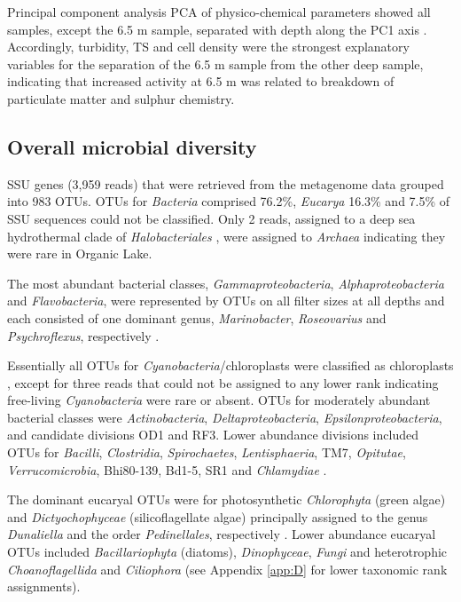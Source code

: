 Principal component analysis \acs{PCA} of physico-chemical parameters showed all samples, except the 6.5 m sample, separated with depth along the PC1 axis .
Accordingly, turbidity, \ac{TS} and cell density were the strongest explanatory variables for the separation of the 6.5 m sample from the other deep sample, indicating that increased activity at 6.5 m was related to breakdown of particulate matter and sulphur chemistry.
 

\subsection{Overall microbial diversity}
\ac{SSU} genes (3,959 reads) that were retrieved from the metagenome data grouped into 983 \acp{OTU}. 
\acp{OTU} for \emph{Bacteria} comprised 76.2\%, \emph{Eucarya} 16.3\% and 7.5\% of \ac{SSU} sequences could not be classified. 
Only 2 reads, assigned to a deep sea hydrothermal clade of \emph{Halobacteriales} , were assigned to \emph{Archaea} indicating they were rare in Organic Lake.
 
The most abundant bacterial classes, \emph{Gammaproteobacteria}, \emph{Alphaproteobacteria} and \emph{Flavobacteria}, were represented by \acp{OTU} on all filter sizes at all depths and each consisted of one dominant genus, \emph{Marinobacter}, \emph{Roseovarius} and \emph{Psychroflexus}, respectively . 

Essentially all \acp{OTU} for \emph{Cyanobacteria}/chloroplasts were classified as chloroplasts , except for three reads that could not be assigned to any lower rank  indicating free-living \emph{Cyanobacteria} were rare or absent. 
\acp{OTU} for moderately abundant bacterial classes were \emph{Actinobacteria}, \emph{Deltaproteobacteria}, \emph{Epsilonproteobacteria}, and candidate divisions OD1 and RF3. 
Lower abundance divisions included \acp{OTU} for \emph{Bacilli}, \emph{Clostridia}, \emph{Spirochaetes}, \emph{Lentisphaeria}, TM7, \emph{Opitutae}, \emph{Verrucomicrobia}, Bhi80-139, Bd1-5, SR1 and \emph{Chlamydiae} .

 The dominant eucaryal \acp{OTU} were for photosynthetic \emph{Chlorophyta} (green algae) and \emph{Dictyochophyceae} (silicoflagellate algae)  principally assigned to the genus \emph{Dunaliella} and the order \emph{Pedinellales}, respectively . 
Lower abundance eucaryal \acp{OTU} included \emph{Bacillariophyta} (diatoms), \emph{Dinophyceae}, \emph{Fungi} and heterotrophic \emph{Choanoflagellida} and \emph{Ciliophora} (see Appendix \ref{app:D} for lower taxonomic rank assignments). 



